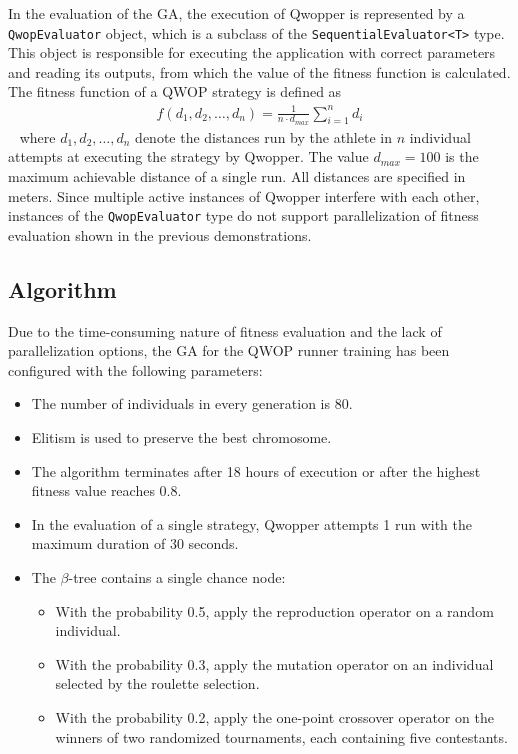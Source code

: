 In the evaluation of the GA, the execution of Qwopper is represented by a \texttt{QwopEvaluator} object, which is a subclass of the \texttt{SequentialEvaluator<T>} type. This object is responsible for executing the application with correct parameters and reading its outputs, from which the value of the fitness function is calculated. The fitness function of a QWOP strategy is defined as
~
\begin{align}
	f(d_1,d_2,\dots,d_n) = \frac{1}{n \cdot d_{max}} \sum_{i=1}^n d_i
\end{align}
~
where $d_1,d_2,\dots,d_n$ denote the distances run by the athlete in $n$ individual attempts at executing the strategy by Qwopper. The value $d_{max}=100$ is the maximum achievable distance of a single run. All distances are specified in meters. Since multiple active instances of Qwopper interfere with each other, instances of the \texttt{QwopEvaluator} type do not support parallelization of fitness evaluation shown in the previous demonstrations.

\subsection{Algorithm}
Due to the time-consuming nature of fitness evaluation and the lack of parallelization options, the GA for the QWOP runner training has been configured with the following parameters:
~
\begin{itemize}
	\item The number of individuals in every generation is 80.
	\item Elitism is used to preserve the best chromosome.
	\item The algorithm terminates after 18 hours of execution or after the highest fitness value reaches 0.8.
	\item In the evaluation of a single strategy, Qwopper attempts 1 run with the maximum duration of 30 seconds.
	\item The $\beta$-tree contains a single chance node:
	~
	\begin{itemize}
		\item With the probability 0.5, apply the reproduction operator on a random individual.
		\item With the probability 0.3, apply the mutation operator on an individual selected by the roulette selection.
		\item With the probability 0.2, apply the one-point crossover operator on the winners of two randomized tournaments, each containing five contestants.
	\end{itemize}
\end{itemize}

